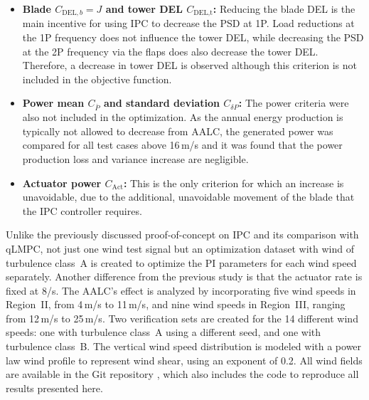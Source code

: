 \begin{itemize}
    \item \textbf{Blade $C_{\text{DEL},b} = J$ and tower DEL $C_{\text{DEL,t}}$:} Reducing the blade DEL is the main incentive for using
    IPC to decrease the PSD at 1P. Load reductions at the 1P frequency does
    not influence the tower DEL, while decreasing the PSD at the 2P frequency via the
    flaps does also decrease the tower DEL. Therefore, a decrease in tower DEL is observed although this criterion is not included in the objective function.  
    \item \textbf{Power mean $C_{\bar{P}}$ and standard deviation $C_{\delta P}$:} The power criteria were also not included in the
    optimization. As the annual energy production is typically not allowed to decrease from AALC,
    the generated power was compared for all test cases above 16\,m/s and it was found
    that the power production loss and variance increase are negligible. %
    \item \textbf{Actuator power $C_{\text{Act}}$:} This is the only criterion for which an increase is
    unavoidable, due to the additional, unavoidable movement of the blade that
    the IPC controller requires. %
\end{itemize}
Unlike the previously discussed proof-of-concept on IPC and its comparison with qLMPC, not just one wind test signal but an optimization dataset with wind of turbulence class~A is created to optimize the PI parameters for each wind speed separately. Another difference from the previous study is that the actuator rate is fixed at 8\textdegree/s. The AALC's effect is analyzed by incorporating five wind speeds in Region~II, from 4\,m/s to 11\,m/s, and nine wind speeds in Region~III, ranging from 12\,m/s to 25\,m/s. Two verification sets are created for the 14 different wind speeds: one with turbulence class~A using a different seed, and one with turbulence class~B. The vertical wind speed distribution is modeled with a power law wind profile to represent wind shear, using an exponent of 0.2. All wind fields are available in the Git repository \cite{GitRepoCodeAALC}, which also includes the code to reproduce all results presented here. 

